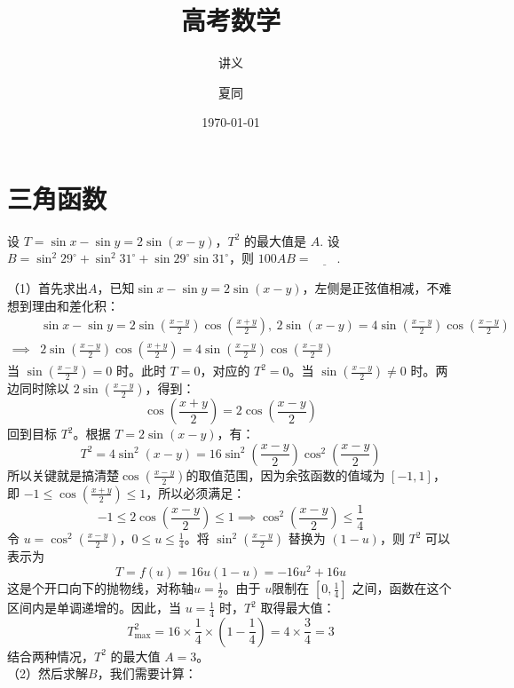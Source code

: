 \documentclass[lang=cn,11pt]{elegantbook}
\title{高考数学}
\subtitle{讲义}
\author{夏同}
\institute{深圳中学}
\date{\today}
\begin{document}
\maketitle
\frontmatter

\tableofcontents

\mainmatter

\chapter{三角函数}

\begin{exercise}
设 $T = \sin x - \sin y = 2\sin(x-y)$，$T^2$ 的最大值是 $A$.
设 $B = \sin^2 29^\circ + \sin^2 31^\circ + \sin 29^\circ \sin 31^\circ$，则 $100AB = \underline{\qquad}$.
\end{exercise}
\begin{solution}
（1）首先求出$A$，已知$\sin x - \sin y = 2\sin(x-y)$，左侧是正弦值相减，不难想到理由和差化积：
\begin{align*}
&\sin x - \sin y = 2\sin\left(\frac{x-y}{2}\right)\cos\left(\frac{x+y}{2}\right),~2\sin(x-y) = 4\sin\left(\frac{x-y}{2}\right)\cos\left(\frac{x-y}{2}\right)\\
\implies & 2\sin\left(\frac{x-y}{2}\right)\cos\left(\frac{x+y}{2}\right) = 4\sin\left(\frac{x-y}{2}\right)\cos\left(\frac{x-y}{2}\right)
\end{align*}
当 $\sin(\frac{x-y}{2}) = 0$ 时。此时 $T = 0$，对应的 $T^2 = 0$。当 $\sin(\frac{x-y}{2}) \neq 0$ 时。两边同时除以 $2\sin(\frac{x-y}{2})$，得到：
$$\cos\left(\frac{x+y}{2}\right) = 2\cos\left(\frac{x-y}{2}\right)$$
回到目标 $T^2$。根据 $T = 2\sin(x-y)$，有：
$$T^2 = 4\sin^2(x-y) = 16\sin^2\left(\frac{x-y}{2}\right)\cos^2\left(\frac{x-y}{2}\right)$$
所以关键就是搞清楚$\cos\left(\frac{x-y}{2}\right)$的取值范围，因为余弦函数的值域为 $[-1, 1]$，即 $-1 \le \cos(\frac{x+y}{2}) \le 1$，所以必须满足：
$$-1 \le 2\cos\left(\frac{x-y}{2}\right) \le 1\implies\cos^2\left(\frac{x-y}{2}\right) \le \frac{1}{4}$$
令 $u = \cos^2(\frac{x-y}{2})$，$0 \le u \le \frac{1}{4}$。将 $\sin^2(\frac{x-y}{2})$ 替换为 $(1 - u)$，则 $T^2$ 可以表示为
$$T=f(u) = 16u(1 - u) = -16u^2 + 16u$$
这是个开口向下的抛物线，对称轴$u = \frac{1}{2}$。由于 $u$限制在 $[0, \frac{1}{4}]$ 之间，函数在这个区间内是单调递增的。因此，当 $u = \frac{1}{4}$ 时，$T^2$ 取得最大值：$$T^2_{\max} = 16 \times \frac{1}{4} \times \left(1 - \frac{1}{4}\right) = 4 \times \frac{3}{4} = 3$$结合两种情况，$T^2$ 的最大值 $A = 3$。\\
（2）然后求解$B$，我们需要计算：
\begin{align*}

\end{align*}
\end{solution}
\end{document}
